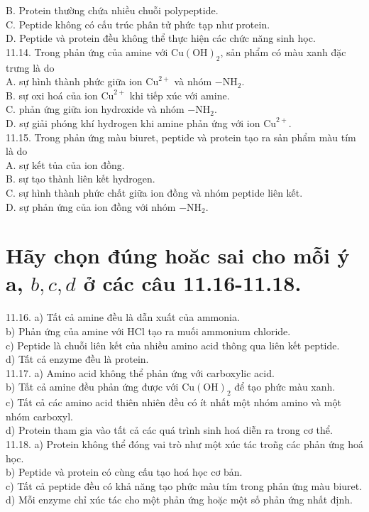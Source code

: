 \documentclass[10pt]{article}
\begin{document}
B. Protein thường chứa nhiều chuỗi polypeptide.\\
C. Peptide không có cấu trúc phân tử phức tạp như protein.\\
D. Peptide và protein đều không thể thực hiện các chức năng sinh học.\\
11.14. Trong phản ứng của amine với $\mathrm{Cu}(\mathrm{OH})_{2}$, sản phẩm có màu xanh đặc trưng là do\\
A. sự hình thành phức giữa ion $\mathrm{Cu}^{2+}$ và nhóm $-\mathrm{NH}_{2}$.\\
B. sự oxi hoá của ion $\mathrm{Cu}^{2+}$ khi tiếp xúc với amine.\\
C. phản ứng giữa ion hydroxide và nhóm $-\mathrm{NH}_{2}$.\\
D. sự giải phóng khí hydrogen khi amine phản ứng với ion $\mathrm{Cu}^{2+}$.\\
11.15. Trong phản ứng màu biuret, peptide và protein tạo ra sản phẩm màu tím là do\\
A. sự kết tủa của ion đồng.\\
B. sự tạo thành liên kết hydrogen.\\
C. sự hình thành phức chất giữa ion đồng và nhóm peptide liên kết.\\
D. sự phản ứng của ion đồng với nhóm $-\mathrm{NH}_{2}$.

\section*{Hãy chọn đúng hoăc sai cho mỗi ý a, $b, c, d$ ở các câu 11.16-11.18.}
11.16. a) Tất cả amine đều là dẫn xuất của ammonia.\\
b) Phản ứng của amine với HCl tạo ra muối ammonium chloride.\\
c) Peptide là chuỗi liên kết của nhiều amino acid thông qua liên kết peptide.\\
d) Tất cả enzyme đều là protein.\\
11.17. a) Amino acid không thể phản ứng với carboxylic acid.\\
b) Tất cả amine đều phản ứng được với $\mathrm{Cu}(\mathrm{OH})_{2}$ để tạo phức màu xanh.\\
c) Tất cả các amino acid thiên nhiên đều có ít nhất một nhóm amino và một nhóm carboxyl.\\
d) Protein tham gia vào tất cả các quá trình sinh hoá diễn ra trong cơ thể.\\
11.18. a) Protein không thể đóng vai trò như một xúc tác troñg các phản ứng hoá học.\\
b) Peptide và protein có cùng cấu tạo hoá học cơ bản.\\
c) Tất cả peptide đều có khả năng tạo phức màu tím trong phản ứng màu biuret.\\
d) Mỗi enzyme chỉ xúc tác cho một phản ứng hoặc một số phản ứng nhất định.
\end{document}
